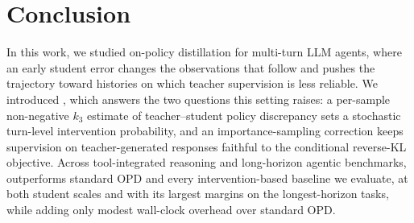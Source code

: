 \section{Conclusion}\label{sec:conclusion}

In this work, we studied on-policy distillation for multi-turn LLM agents, where an early student error changes the observations that follow and pushes the trajectory toward histories on which teacher supervision is less reliable. 
We introduced \name, which answers the two questions this setting raises: a per-sample non-negative $k_3$ estimate of teacher--student policy discrepancy sets a stochastic turn-level intervention probability, and an importance-sampling correction keeps supervision on teacher-generated responses faithful to the conditional reverse-KL objective.
Across tool-integrated reasoning and long-horizon agentic benchmarks, \name outperforms standard OPD and every intervention-based baseline we evaluate, at both student scales and with its largest margins on the longest-horizon tasks, while adding only modest wall-clock overhead over standard OPD. 
